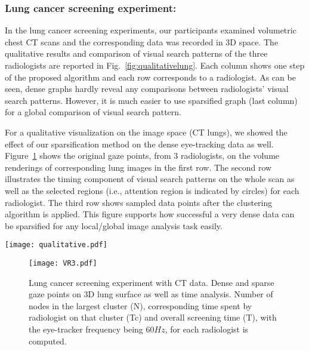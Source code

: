 \documentclass[preprint,12pt]{elsarticle}
\begin{document}
\subsubsection{Lung cancer screening experiment:} In the lung cancer screening experiments, our participants examined volumetric chest CT scans and the corresponding data was recorded in 3D space. The qualitative results and comparison of visual search patterns of the three radiologists are reported in Fig.~\ref{fig:qualitativelung}. Each column shows one step of the proposed algorithm and each row corresponds to a radiologist. As can be seen, dense graphs hardly reveal any comparisons between radiologists' visual search patterns. However, it is much easier to use sparsified graph (last column) for a global comparison of visual search pattern.

For a qualitative visualization on the image space (CT lungs), we showed the effect of our sparsification method on the dense eye-tracking data as well. Figure~\ref{fig:VRlung} shows the original gaze points, from $3$ radiologists, on the volume renderings of corresponding lung images in the first row. The second row illustrates the timing component of visual search patterns on the whole scan as well as the selected regions (i.e., attention region is indicated by circles) for each radiologist. The third row shows sampled data points after the clustering algorithm is applied. This figure supports how successful a very dense data can be sparsified for any local/global image analysis task easily.

\begin{figure*}
\centering
\texttt{[image: qualitative.pdf]}
\caption{Lung cancer screening experiments with CT data. First column: dense gaze patterns. Second column: attention based clustering. Third column: nodes in clusters are reduced. Fourth column: sparse graph after further reducing edges. \label{fig:qualitativelung}}
\end{figure*}
\begin{figure}[h]
\texttt{[image: VR3.pdf]}
\caption{Lung cancer screening experiment with CT data. Dense and sparse gaze points on 3D lung surface as well as time analysis. Number of nodes in the largest cluster (N), corresponding time spent by radiologist on that cluster (Tc) and overall screening time (T), with the eye-tracker frequency being $60Hz$, for each radiologist is computed. \label{fig:VRlung}}
\end{figure}
\end{document}

